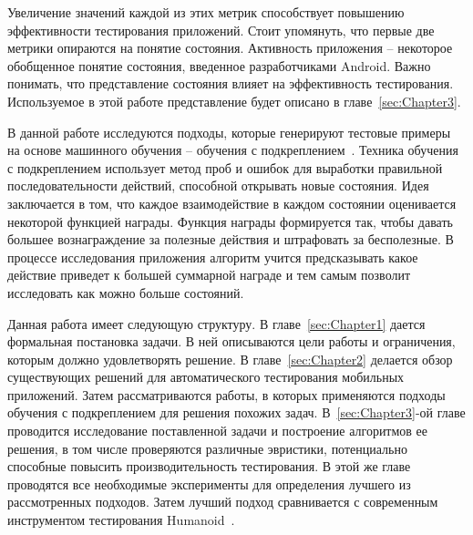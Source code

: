 Увеличение значений каждой из этих метрик способствует повышению эффективности тестирования приложений. Стоит упомянуть, что первые две метрики опираются на понятие состояния. Активность приложения -- некоторое обобщенное понятие состояния, введенное разработчиками Android. Важно понимать, что представление состояния влияет на эффективность тестирования. Используемое в этой работе представление будет описано в главе~\ref{sec:Chapter3}. 

В данной работе исследуются подходы, которые генерируют тестовые примеры на основе машинного обучения -- обучения с подкреплением~\cite{szepesvari2010algorithms}. Техника обучения с подкреплением использует метод проб и ошибок для выработки правильной последовательности действий, способной открывать новые состояния. Идея заключается в том, что каждое взаимодействие в каждом состоянии оценивается некоторой функцией награды. Функция награды формируется так, чтобы давать большее вознаграждение за полезные действия и штрафовать за бесполезные. В процессе исследования приложения алгоритм учится предсказывать какое действие приведет к большей суммарной награде и тем самым позволит исследовать как можно больше состояний.

Данная работа имеет следующую структуру. В главе~\ref{sec:Chapter1} дается формальная постановка задачи. В ней описываются цели работы и ограничения, которым должно удовлетворять решение. В главе~\ref{sec:Chapter2} делается обзор существующих решений для автоматического тестирования мобильных приложений. Затем рассматриваются работы, в которых применяются подходы обучения с подкреплением для решения похожих задач. В~\ref{sec:Chapter3}-ой главе проводится исследование поставленной задачи и построение алгоритмов ее решения, в том числе проверяются различные эвристики, потенциально способные повысить производительность тестирования. В этой же главе проводятся все необходимые эксперименты для определения лучшего из рассмотренных подходов. Затем лучший подход сравнивается с современным инструментом тестирования Humanoid~\cite{li2019deep}.